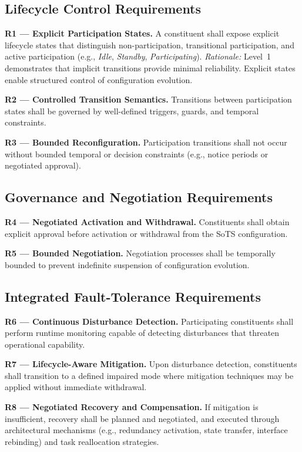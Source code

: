 \subsection{Lifecycle Control Requirements}

\textbf{R1 — Explicit Participation States.}  
A constituent shall expose explicit lifecycle states that distinguish non-participation, transitional participation, and active participation (e.g., \emph{Idle}, \emph{Standby}, \emph{Participating}).  
\emph{Rationale:} Level~1 demonstrates that implicit transitions provide minimal reliability. Explicit states enable structured control of configuration evolution.

\textbf{R2 — Controlled Transition Semantics.}  
Transitions between participation states shall be governed by well-defined triggers, guards, and temporal constraints.  

\textbf{R3 — Bounded Reconfiguration.}  
Participation transitions shall not occur without bounded temporal or decision constraints (e.g., notice periods or negotiated approval).  

\subsection{Governance and Negotiation Requirements}

\textbf{R4 — Negotiated Activation and Withdrawal.}  
Constituents shall obtain explicit approval before activation or withdrawal from the SoTS configuration.  

\textbf{R5 — Bounded Negotiation.}  
Negotiation processes shall be temporally bounded to prevent indefinite suspension of configuration evolution.  

\subsection{Integrated Fault-Tolerance Requirements}

\textbf{R6 — Continuous Disturbance Detection.}  
Participating constituents shall perform runtime monitoring capable of detecting disturbances that threaten operational capability.  

\textbf{R7 — Lifecycle-Aware Mitigation.}  
Upon disturbance detection, constituents shall transition to a defined impaired mode where mitigation techniques may be applied without immediate withdrawal.  

\textbf{R8 — Negotiated Recovery and Compensation.}  
If mitigation is insufficient, recovery shall be planned and negotiated, and executed through architectural mechanisms (e.g., redundancy activation, state transfer, interface rebinding) and task reallocation strategies.  

